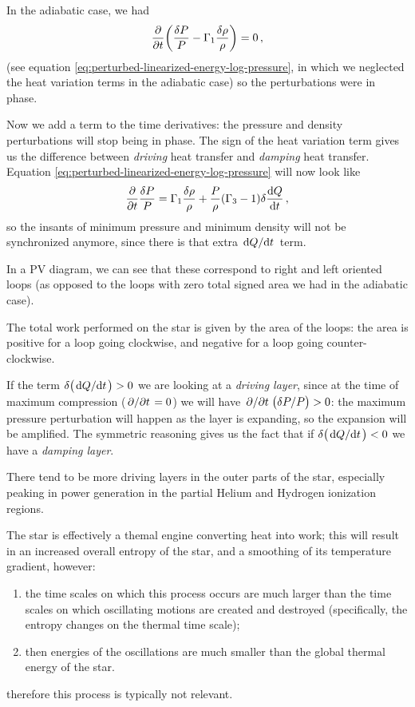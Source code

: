 \documentclass[main.tex]{subfiles}
\begin{document}
In the adiabatic case, we had 
%
\begin{align}
\pdv{}{t}\qty( \frac{\delta P}{P} - \Gamma_1 \frac{\delta \rho}{\rho}) =0
\,,
\end{align}
%
(see equation \eqref{eq:perturbed-linearized-energy-log-pressure}, in which we neglected the heat variation terms in the adiabatic case) so the perturbations were in phase.

Now we add a term to the time derivatives: the pressure and density perturbations will stop being in phase. The sign of the heat variation term gives us the difference between \emph{driving} heat transfer and \emph{damping} heat transfer. Equation \eqref{eq:perturbed-linearized-energy-log-pressure} will now look like 
%
\begin{align}
\pdv{}{t} \frac{ \delta P}{P} = \Gamma_1 \frac{ \delta \rho }{\rho } + \frac{P}{\rho } (\Gamma_3 -1) \delta \dv{Q}{t}
\,,
\end{align}
%
so the insants of minimum pressure and minimum density will not be synchronized anymore, since there is that extra \(\dv*{Q}{t}\) term. 

In a PV diagram, we can see that these correspond to right and left oriented loops (as opposed to the loops with zero total signed area we had in the adiabatic case).

The total work performed on the star is given by the area of the loops: the area is positive for a loop going clockwise, and negative for a loop going counter-clockwise.

If the term \(\delta \qty(\dv*{Q}{t})>0\) we are looking at a \emph{driving layer}, since at the time of maximum compression (\(\pdv*{}{t} (\delta \rho  / \rho ) = 0\)) we will have \(\pdv*{}{t} \qty(\delta P / P) > 0\): the maximum pressure perturbation will happen as the layer is expanding, so the expansion will be amplified.
The symmetric reasoning gives us the fact that if \(\delta \qty(\dv*{Q}{t}) < 0\) we have a \emph{damping layer}. 

There tend to be more driving layers in the outer parts of the star, especially peaking in power generation in the partial Helium and Hydrogen ionization regions.  

\begin{bluebox}
The star is effectively a themal engine converting heat into work; this will result in an increased overall entropy of the star, and a smoothing of its temperature gradient, however:
%
\begin{enumerate}
\item the time scales on which this process occurs are much larger than the time scales on which oscillating motions are created and destroyed (specifically, the entropy changes on the thermal time scale);
\item then energies of the oscillations are much smaller than the global thermal energy of the star.
\end{enumerate}
%
therefore this process is typically not relevant.
\end{bluebox}
\end{document}
